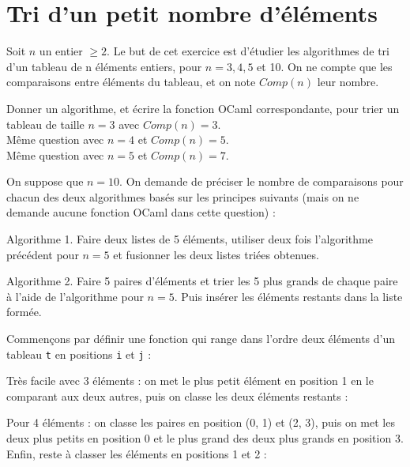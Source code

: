 \renewcommand{\SourceFile}{1-parcours-de-tableaux/src/1-5.ml}

\section{Tri d'un petit nombre d'éléments}

Soit $n$ un entier $\geq 2$. Le but de cet exercice est d'étudier les algorithmes de tri d'un tableau de n éléments entiers, pour $n=3,4,5$ et 10. On ne compte que les comparaisons entre éléments du tableau, et on note $Comp(n)$ leur nombre.

\Q
Donner un algorithme, et écrire la fonction OCaml correspondante, pour trier un tableau de taille $n=3$ avec $Comp(n)=3$.\\
Même question avec $n=4$ et $Comp(n)=5$.\\
Même question avec $n=5$ et $Comp(n)=7$.

\Q
On suppose que $n=10$. On demande de préciser le nombre de comparaisons pour chacun des deux algorithmes basés sur les principes suivants (mais on ne demande aucune fonction OCaml dans cette question) :
\medskip

Algorithme 1. Faire deux listes de 5 éléments, utiliser deux fois l'algorithme précédent pour $n=5$ et fusionner les deux listes triées obtenues.
\medskip

Algorithme 2. Faire 5 paires d'éléments et trier les 5 plus grands de chaque paire à l'aide de l'algorithme pour $n=5$. Puis insérer les éléments restants dans la liste formée.

\Corrige
\vspace{.6cm}

Commençons par définir une fonction qui range dans l'ordre deux éléments d'un tableau \texttt{t} en positions \texttt{i} et \texttt{j} :



\Q
Très facile avec 3 éléments : on met le plus petit élément en position 1 en le comparant aux deux autres, puis on classe les deux éléments restants :



Pour 4 éléments : on classe les paires en position (0, 1) et (2, 3), puis on met les deux plus petits en position 0 et le plus grand des deux plus grands en position 3. Enfin, reste à classer les éléments en positions 1 et 2 :



